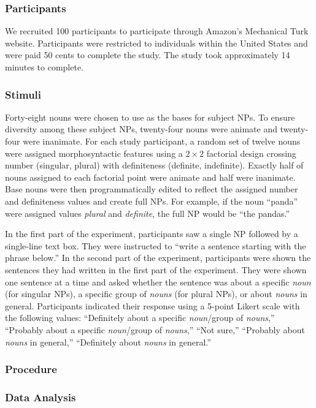 \documentclass[10pt,letterpaper]{article}
\begin{document}
\subsubsection{Participants} \quad We recruited 100 participants to participate through Amazon's Mechanical Turk website. Participants were restricted to individuals within the United States and were paid 50 cents to complete the study. The study took approximately 14 minutes to complete.

\subsubsection{Stimuli} \quad Forty-eight nouns were chosen to use as the bases for subject NPs. To ensure diversity among these subject NPs, twenty-four nouns were animate and twenty-four were inanimate. For each study participant, a random set of twelve nouns were assigned morphosyntactic features using a \(2 \times 2\) factorial design crossing number (singular, plural) with definiteness (definite, indefinite). Exactly half of nouns assigned to each factorial point were animate and half were inanimate. Base nouns were then programmatically edited to reflect the assigned number and definiteness values and create full NPs. For example, if the noun ``panda'' were assigned values \textit{plural} and \textit{definite}, the full NP would be ``the pandas.''

In the first part of the experiment, participants saw a single NP followed by a single-line text box. They were instructed to ``write a sentence starting with the phrase below.'' In the second part of the experiment, participants were shown the sentences they had written in the first part of the experiment. They were shown one sentence at a time and asked whether the sentence was about a specific \textit{noun} (for singular NPs), a specific group of \textit{nouns} (for plural NPs), or about \textit{nouns} in general. Participants indicated their response using a 5-point Likert scale with the following values: ``Definitely about a specific \textit{noun}/group of \textit{nouns},'' ``Probably about a specific \textit{noun}/group of \textit{nouns},'' ``Not sure,'' ``Probably about \textit{nouns} in general,'' ``Definitely about \textit{nouns} in general.''

\subsubsection{Procedure}

\subsubsection{Data Analysis}
\end{document}

